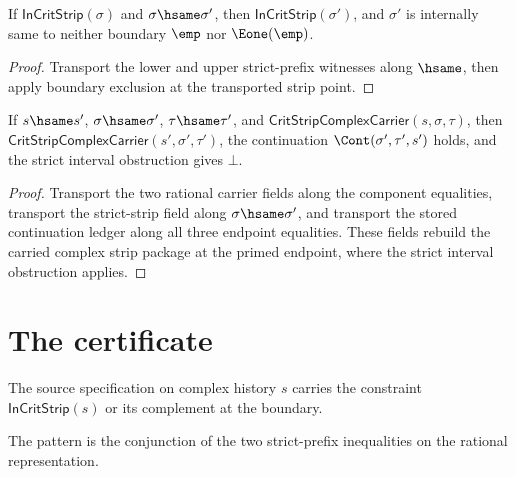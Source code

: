 \begin{lemma}
\label{lem:strip-hsame-respect}
If \(\mathsf{InCritStrip}(\sigma)\) and \(\sigma\hsame\sigma'\), then
\(\mathsf{InCritStrip}(\sigma')\), and \(\sigma'\) is internally same to
neither boundary \(\emp\) nor \(\Eone(\emp)\).
\end{lemma}
\begin{proof}
Transport the lower and upper strict-prefix witnesses along \(\hsame\), then
apply boundary exclusion at the transported strip point.
\end{proof}

\begin{theorem}
\label{thm:crit-strip-complex-carrier-hsame-transport}
If \(s\hsame s'\), \(\sigma\hsame\sigma'\), \(\tau\hsame\tau'\), and
\(\mathsf{CritStripComplexCarrier}(s,\sigma,\tau)\), then
\(\mathsf{CritStripComplexCarrier}(s',\sigma',\tau')\), the continuation
\(\Cont(\sigma',\tau',s')\) holds, and the strict interval obstruction gives
\(\bot\).
\end{theorem}
\begin{proof}
Transport the two rational carrier fields along the component equalities,
transport the strict-strip field along \(\sigma\hsame\sigma'\), and transport
the stored continuation ledger along all three endpoint equalities. These
fields rebuild the carried complex strip package at the primed endpoint, where
the strict interval obstruction applies.
\end{proof}

\section{The certificate}

\begin{definition}
\label{def:crit-strip-source-spec}
The source specification on complex history \(s\) carries the constraint \(\mathsf{InCritStrip}(s)\) or its complement at the boundary.
\end{definition}

\begin{definition}
\label{def:crit-strip-pattern-spec}
The pattern is the conjunction of the two strict-prefix inequalities on the rational representation.
\end{definition}

